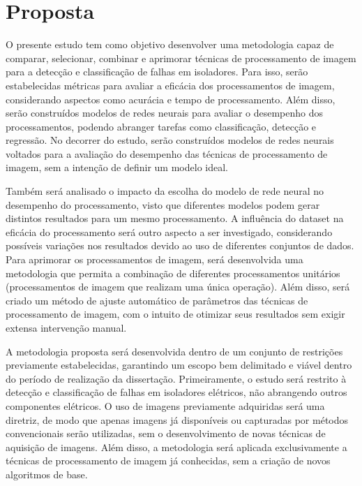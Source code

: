 \maketitle

\newpage

\section{Proposta}

O presente estudo tem como objetivo desenvolver uma metodologia capaz de comparar, selecionar, combinar e aprimorar técnicas de processamento de imagem para a detecção e classificação de falhas em isoladores. Para isso, serão estabelecidas métricas para avaliar a eficácia dos processamentos de imagem, considerando aspectos como acurácia e tempo de processamento. Além disso, serão construídos modelos de redes neurais para avaliar o desempenho dos processamentos, podendo abranger tarefas como classificação, detecção e regressão. No decorrer do estudo, serão construídos modelos de redes neurais voltados para a avaliação do desempenho das técnicas de processamento de imagem, sem a intenção de definir um modelo ideal.

Também será analisado o impacto da escolha do modelo de rede neural no desempenho do processamento, visto que diferentes modelos podem gerar distintos resultados para um mesmo processamento. A influência do dataset na eficácia do processamento será outro aspecto a ser investigado, considerando possíveis variações nos resultados devido ao uso de diferentes conjuntos de dados. Para aprimorar os processamentos de imagem, será desenvolvida uma metodologia que permita a combinação de diferentes processamentos unitários (processamentos de imagem que realizam uma única operação). Além disso, será criado um método de ajuste automático de parâmetros das técnicas de processamento de imagem, com o intuito de otimizar seus resultados sem exigir extensa intervenção manual.

A metodologia proposta será desenvolvida dentro de um conjunto de restrições previamente estabelecidas, garantindo um escopo bem delimitado e viável dentro do período de realização da dissertação. Primeiramente, o estudo será restrito à detecção e classificação de falhas em isoladores elétricos, não abrangendo outros componentes elétricos. O uso de imagens previamente adquiridas será uma diretriz, de modo que apenas imagens já disponíveis ou capturadas por métodos convencionais serão utilizadas, sem o desenvolvimento de novas técnicas de aquisição de imagens. Além disso, a metodologia será aplicada exclusivamente a técnicas de processamento de imagem já conhecidas, sem a criação de novos algoritmos de base.

